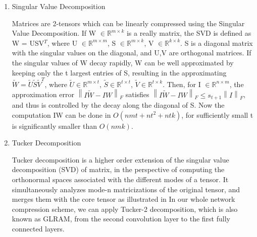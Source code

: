 \documentclass[a4paper]{article}
\begin{document}
\begin{enumerate}
\item Singular Value Decomposition\cite{singular}
\par Matrices are 2-tensors which can be linearly compressed using the Singular Value Decomposition. If W  \begin{math} \in \mathbb{R}^{m\times k} \end{math} is a really matrix, the SVD is defined as W = USV$^{T}$, where U \begin{math} \in \mathbb{R}^{m\times m} \end{math}, S \begin{math} \in \mathbb{R}^{m\times k} \end{math}, V \begin{math} \in \mathbb{R}^{k \times k} \end{math}. S is a diagonal matrix with the singular values on the diagonal, and U,V are orthogonal matrices. If the singular values of W decay rapidly, W can be well approximated by keeping only the t largest entries of S, resulting in the approximating \begin{math}\tilde{W} = \tilde{U} \tilde{S} \tilde{V} ^{T}\end{math}, where  \begin{math} \tilde{U} \in \mathbb{R}^{m\times t} \end{math}, \begin{math} \tilde{S} \in \mathbb{R}^{t \times t} \end{math},  \begin{math} \tilde{V} \in \mathbb{R}^{t \times k}\end{math}. Then, for I \begin{math} \in \mathbb{R}^{n\times m} \end{math}, the approximation error $\left \| I\tilde{W} -IW \right \|_{F}$ satisfies $\left \| I\tilde{W} -IW \right \|_{F} \leq s_{t+1} \left \| I \right \|_{F}$, and thus is controlled by the decay along the diagonal of S. Now the computation IW can be done in $O(nmt + nt^{2} + ntk)$, for sufficiently small t is significantly smaller than $O(nmk)$.


\item Tucker Decomposition\cite{tucker}
\par  Tucker decomposition is a higher order extension of the singular value decomposition (SVD) of matrix, in the perspective of computing the orthonormal spaces associated with the different modes of a tensor. It simultaneously analyzes mode-n matricizations of the original tensor, and merges them with the core tensor as illustrated in In our whole network compression scheme, we can apply Tucker-2 decomposition, which is also known as GLRAM\cite{glram}, from the second convolution layer to the first fully connected layers. 



\end{enumerate}
\end{document}
